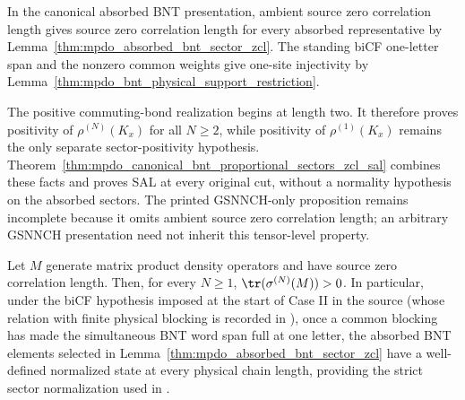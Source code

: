 \begin{remark}
    \label{rem:mpdo_prop4to2_sectorwise_zcl_boundary}
    In the canonical absorbed BNT presentation, ambient source zero
    correlation length gives source zero correlation length for every
    absorbed representative by
    Lemma~\ref{thm:mpdo_absorbed_bnt_sector_zcl}. The standing biCF
    one-letter span and the nonzero common weights give one-site injectivity by
    Lemma~\ref{thm:mpdo_bnt_physical_support_restriction}.

    The positive commuting-bond realization begins at length two. It therefore
    proves positivity of $\rho^{(N)}(K_x)$ for all $N\geq2$, while positivity
    of $\rho^{(1)}(K_x)$ remains the only separate sector-positivity
    hypothesis. Theorem~\ref{thm:mpdo_canonical_bnt_proportional_sectors_zcl_sal}
    combines these facts and proves SAL at every original cut, without a
    normality hypothesis on the absorbed sectors. The printed GSNNCH-only
    proposition remains incomplete because it omits ambient source zero
    correlation length; an arbitrary GSNNCH presentation need not inherit this
    tensor-level property.

\end{remark}

\begin{lemma}
    \label{thm:mpdo_source_zcl_strict_positive_length_normalization}
    \leanok
    Let $M$ generate matrix product density operators and have source zero
    correlation length. Then, for every $N\geq1$,
    $\tr(\sigma^{(N)}(M))>0$.
    In particular, under the biCF hypothesis imposed at the start of Case II in
    the source (whose relation with finite physical blocking is recorded in
    \cite{gap:cpgsv17_bicf_block_separation}), once a common blocking has made
    the simultaneous BNT word span full at one letter, the absorbed BNT
    elements selected in Lemma~\ref{thm:mpdo_absorbed_bnt_sector_zcl} have a
    well-defined normalized state at every physical chain length, providing the
    strict sector normalization used in
    \cite[Appendix~C.2, lines~1760--1780]{Cirac2016MPDO_arXiv}.
\end{lemma}

